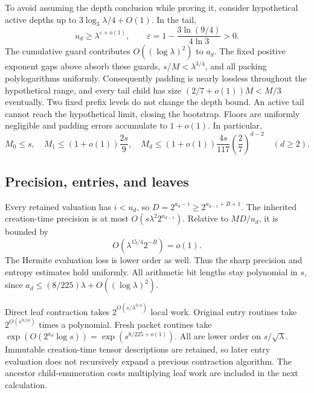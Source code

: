 \documentclass[11pt]{article}
\theoremstyle{remark}\newtheorem{remark}[theorem]{Remark}
\begin{document}
To avoid assuming the depth conclusion while proving it, consider
hypothetical active depths up to $3\log_3\lambda/4+O(1)$. In the tail,
\[
 u_d\ge\lambda^{\varepsilon+o(1)},\qquad
 \varepsilon=1-\frac{3\ln(9/4)}{4\ln3}>0.
\]
The cumulative guard contributes $O((\log\lambda)^2)$ to $a_d$.
The fixed positive exponent gaps above absorb these guards,
$s/M<\lambda^{3/4}$, and all packing polylogarithms uniformly.
Consequently padding is nearly lossless throughout the hypothetical range,
and every tail child has size $(2/7+o(1))M<M/3$ eventually. Two fixed
prefix levels do not change the depth bound. An active tail cannot reach
the hypothetical limit, closing the bootstrap. Floors are uniformly
negligible and padding errors accumulate to $1+o(1)$.
In particular,
\begin{equation}
 M_0\le s,\quad M_1\le(1+o(1))\frac{2s}9,\quad
 M_d\le(1+o(1))\frac{4s}{117}
                    \left(\frac27\right)^{d-2}\quad(d\ge2).
 \label{eq:Mdepth}
\end{equation}

\subsection{Precision, entries, and leaves}
Every retained valuation has $i<u_d$, so
$D=2^{a_d-i}\ge2^{a_{d-1}+B+1}$. The inherited creation-time precision is
at most $O(s\lambda^2 2^{a_{d-1}})$. Relative to $MD/u_d$, it is bounded by
\[
 O\left(\lambda^{15/4}2^{-B}\right)=o(1).
\]
The Hermite evaluation loss is lower order as well. Thus the sharp precision
and entropy estimates hold uniformly. All arithmetic bit lengths stay
polynomial in $s$, since $a_d\le(8/225)\lambda+O((\log\lambda)^2)$.

Direct leaf contraction takes $2^{O(s/\lambda^{3/4})}$ local work.
Original entry routines take $2^{O(s^{9/10})}$ times a polynomial. Fresh
packet routines take $\exp(O(2^{a_d}\log s))=\exp(s^{8/225+o(1)})$.
All are lower order on $s/\sqrt\lambda$. Immutable creation-time tensor
descriptions are retained, so later entry evaluation does not recursively
expand a previous contraction algorithm. The ancestor child-enumeration
costs multiplying leaf work are included in the next calculation.
\end{document}
